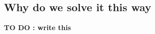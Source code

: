\documentclass[12pt, titlepage, twoside, openright]{report}
\begin{document}
\subsection{Why do we solve it this way}\label{sec: explanation solve for d and m}
\textbf{TO DO : write this}
\end{document}
